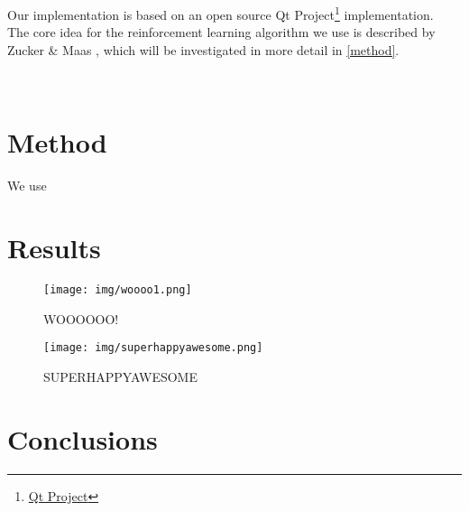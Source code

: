 \documentclass{ml}
\begin{document}
Our implementation is based on an open source Qt Project\footnote{\href{https://qt-project.org/doc/qt-4.8/widgets-tetrix.html}{Qt Project}} implementation. \\
The core idea for the reinforcement learning algorithm we use is described by Zucker \& Maas \cite{zucker2009learning}, which will be investigated in more detail in \autoref{method}.

\\
\section{Method}
\label{method}

We use 

\lipsum[9-12]


\section{Results}
\label{results}

\lipsum[1-2] 

\begin{wrapfigure}{r}{0.5\textwidth}
\vspace{-10pt}
  \begin{center}
    \texttt{[image: img/woooo1.png]}
  \end{center}
  \vspace{-10pt}
  \caption{\small{WOOOOOO!}}
  \label{wooo}
  \vspace{-10pt}
\end{wrapfigure}

\lipsum[3-4]


\begin{wrapfigure}{l}{0.5\textwidth}
\vspace{-10pt}
  \begin{center}
    \texttt{[image: img/superhappyawesome.png]}
  \end{center}
  \vspace{-10pt}
  \caption{\small{SUPERHAPPYAWESOME}}
  \label{superhappyawesome}
  \vspace{-10pt}
\end{wrapfigure}

\lipsum[5-6]


\section{Conclusions}
\label{conclusions}

\lipsum[7-9]


\newpage


\end{document}
